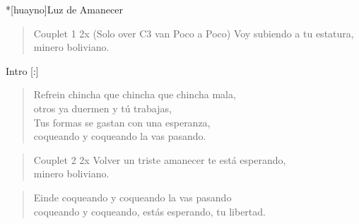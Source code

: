 \clearpage
\begin{song}*[huayno]{Luz de Amanecer}
\begin{verse}{Couplet 1 2x (Solo over C3 van Poco a Poco)}
Voy subiendo a tu estatura, \\
minero boliviano. \hspace{4em} \hspace{1em} 
\end{verse}

\begin{instrumental}{Intro}
\measure{}\measure{}\measure{}\measure{}
\measure{}\measure{}\measure{}\measure{}[:]
\end{instrumental}


\begin{verse}{Refrein}
chincha que chincha que chincha mala,\\
otros ya duermen y tú trabajas,\\
Tus formas se gastan con una esperanza,\\
coqueando y coqueando la vas pasando. \hspace{4em} \hspace{1em} 
\end{verse}


\begin{verse}{Couplet 2 2x}
Volver un triste amanecer te está esperando,\\
minero boliviano. \hspace{4em} \hspace{1em} 
\end{verse}


\begin{verse}{Einde}
coqueando y coqueando la vas pasando\\
coqueando y coqueando, estás esperando, tu libertad. \hspace{3em} \hspace{2em} \hspace{2em} \hspace{1em} \hspace{1em}
\end{verse}
\end{song}

